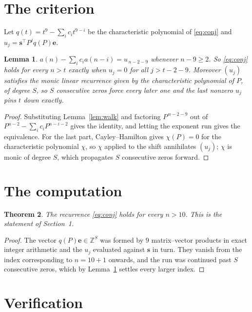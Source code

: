 \documentclass[11pt,a4paper]{article}
\theoremstyle{plain}
\newtheorem{theorem}{Theorem}
\newtheorem{lemma}[theorem]{Lemma}
\theoremstyle{definition}
\begin{document}
\section{The criterion}

Let $q(t)=t^{9}-\sum_i c_i t^{9-i}$ be the characteristic polynomial of
\eqref{eq:conj} and $u_j=\mathbf{s}^{\!\top}P^{j}q(P)\mathbf{e}$.

\begin{lemma}\label{lem:crit}
$a(n)-\sum_i c_i a(n-i)=u_{\,n-2-9}$ whenever $n-9\ge2$. So \eqref{eq:conj}
holds for every $n>t$ exactly when $u_j=0$ for all $j>t-2-9$. Moreover $(u_j)$
satisfies the monic linear recurrence given by the characteristic polynomial of $P$, of
degree $S$, so $S$ consecutive zeros force every later one and the last nonzero $u_j$ pins
$t$ down exactly.
\end{lemma}

\begin{proof}
Substituting Lemma~\ref{lem:walk} and factoring $P^{\,n-2-9}$ out of
$P^{n-2}-\sum_i c_i P^{n-i-2}$ gives the identity, and letting the exponent run gives the
equivalence. For the last part, Cayley--Hamilton gives $\chi(P)=0$ for the characteristic
polynomial $\chi$, so $\chi$ applied to the shift annihilates $(u_j)$; $\chi$ is monic of
degree $S$, which propagates $S$ consecutive zeros forward.
\end{proof}

\section{The computation}

\begin{theorem}
The recurrence \eqref{eq:conj} holds for every $n>10$. This is the statement of
Section~1.
\end{theorem}

\begin{proof}
The vector $q(P)\mathbf{e}\in\mathbb{Z}^{S}$ was formed by $9$ matrix--vector
products in exact integer arithmetic and the $u_j$ evaluated against $\mathbf{s}$ in turn.
They vanish from the index corresponding to $n=10+1$ onwards, and the run was continued
past $S$ consecutive zeros, which by Lemma~\ref{lem:crit} settles every larger index.
\end{proof}

\section{Verification}
\end{document}
